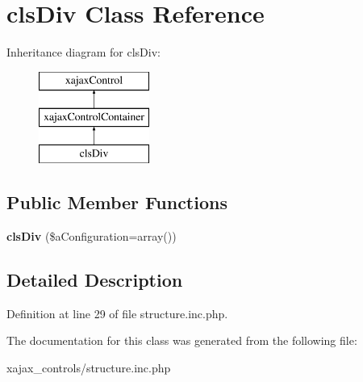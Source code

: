 \hypertarget{classclsDiv}{
\section{clsDiv Class Reference}
\label{classclsDiv}
}
Inheritance diagram for clsDiv:\begin{figure}[H]
\begin{center}
\leavevmode
\includegraphics[height=3.000000cm]{classclsDiv}
\end{center}
\end{figure}
\subsection*{Public Member Functions}
\begin{DoxyCompactItemize}
\item 
\hypertarget{classclsDiv_a58289f447cff1fe2a92e6fc22fde5690}{
{\bfseries clsDiv} (\$aConfiguration=array())}
\label{classclsDiv_a58289f447cff1fe2a92e6fc22fde5690}

\end{DoxyCompactItemize}


\subsection{Detailed Description}


Definition at line 29 of file structure.inc.php.



The documentation for this class was generated from the following file:\begin{DoxyCompactItemize}
\item 
xajax\_\-controls/structure.inc.php\end{DoxyCompactItemize}
